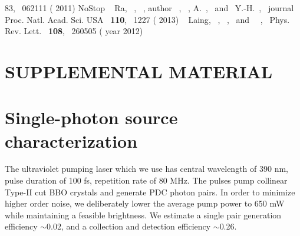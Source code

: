 \documentclass[aps,prl,twocolumn,superscriptaddress]{revtex4-1}
\begin{document}
\begin{thebibliography}{42}
{{			{83}},\  {062111} ( {2011})}\BibitemShut
	{NoStop}%
	\BibitemOpen
	 { {\ \bibnamefont
			{Ra}},  {\ },
		 {\ }, \bibinfo
		{author} {~}, 
		{~},  {\bibfnamefont
			{A.}~}, \ and\  {\bibfnamefont
			{Y.-H.}\ },\ }\href@noop {} { {\bibinfo
			{journal} {Proc. Natl. Acad. Sci. USA}\ }\textbf { {110}},\
		 {1227} ( {2013})}%
	\BibitemOpen
	 { {~\bibnamefont
			{Laing}},  {~},
		\bibinfo {author} {\bibfnamefont {E.}~}, \
		and\  {\ },\
	}\href@noop {} { { {Phys. Rev. Lett.}\
		}\textbf { {108}},\  {260505} (\bibinfo
		{year} {2012})}\BibitemShut {NoStop}%
\end{thebibliography}%


%
%
%
%

\section{SUPPLEMENTAL MATERIAL}
\renewcommand{\thefigure}{S\arabic{figure}}
\setcounter{figure}{0}
\renewcommand{\theequation}{S.\arabic{equation}}
\setcounter{equation}{0}
\renewcommand{\thesection}{S.\Roman{section}}
\setcounter{section}{0}

\section{Single-photon source characterization}

The ultraviolet pumping laser which we use has central wavelength of 390 nm, pulse duration of 100 fs, repetition rate of 80 MHz. The pulses pump collinear Type-II cut BBO crystals and generate PDC photon pairs. In order to minimize higher order noise, we deliberately lower the average pump power to 650 mW while maintaining a feasible brightness. We estimate a single pair generation efficiency $\sim$0.02, and a collection and detection efficiency $\sim$0.26. 
\end{document}
